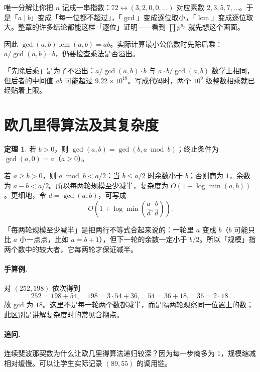 \documentclass[UTF8,a4paper,11pt,twoside,openright,fontset=fandol]{ctexbook}
\theoremstyle{definition}
\newtheorem{theorem}[definition]{定理}
\newcommand{\lcm}{\operatorname{lcm}}
\begin{document}
\begin{tip}
唯一分解让你把 $n$ 记成一串指数：$72\leftrightarrow(3,2,0,0,\ldots)$ 对应素数 $2,3,5,7,\ldots$。于是「$a\mid b$」变成「每一位都不超过」，「$\gcd$」变成逐位取小，「$\lcm$」变成逐位取大。整章的许多结论都能这样「逐位」证明——看到 $\prod p^{u_p}$ 就先想这个画面。
\end{tip}

因此 $\gcd(a,b)\lcm(a,b)=ab$。实际计算最小公倍数时先除后乘：$a/\gcd(a,b)\cdot b$，仍要检查乘法是否溢出。


\begin{tip}
「先除后乘」是为了不溢出：$a/\gcd(a,b)\cdot b$ 与 $a\cdot b/\gcd(a,b)$ 数学上相同，但后者的中间值 $ab$ 可能超过 $9.22\times10^{18}$。写成代码时，两个 $10^9$ 级整数相乘就已经贴着上限。
\end{tip}



\section{欧几里得算法及其复杂度}
\begin{theorem}
若 $b>0$，则 $\gcd(a,b)=\gcd(b,a\bmod b)$；终止条件为 $\gcd(a,0)=a$（$a\ge0$）。
\end{theorem}
若 $a\ge b>0$，则 $a\bmod b<a/2$：当 $b\le a/2$ 时余数小于 $b$；否则商为 $1$，余数为 $a-b<a/2$。所以每两轮规模至少减半，复杂度为 $O(1+\log\min(a,b))$。更细地，令 $d=\gcd(a,b)$，可写成
\[
 O\!\left(1+\log\min\left(\frac ad,\frac bd\right)\right).
\]

\begin{tip}[口径：「每两轮规模至少减半」]
「每两轮规模至少减半」是把两行不等式合起来说的：一轮里 $a$ 变成 $b$（$b$ 可能只比 $a$ 小一点点，比如 $a=b+1$），但下一轮的余数一定小于 $b/2$。所以「规模」指两个数中的较大者，它每两轮才保证减半。
\end{tip}



\paragraph{手算例.} 对 $(252,198)$ 依次得到
\[
252=198+54,\quad198=3\cdot54+36,\quad54=36+18,\quad36=2\cdot18.
\]
故 gcd 为 $18$。这里不是每一轮两个数都减半，而是隔两轮观察同一位置上的数；此区别是讲解复杂度时的常见含糊点。
\paragraph{追问.} 连续斐波那契数为什么让欧几里得算法递归较深？因为每一步商多为 $1$，规模缩减相对缓慢。可以让学生实际记录 $(89,55)$ 的调用链。
\end{document}
